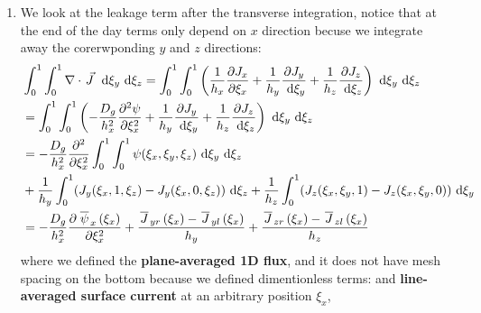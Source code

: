 \documentclass{school-22.211-notes}
\begin{document}
\begin{enumerate}
\item We look at the leakage term after the transverse integration, notice that at the end of the day terms only depend on $x$ direction becuse we integrate away the corerwponding $y$ and $z$ directions:
  \begin{align}
    &\int_0^1 \int_0^1 \nabla \cdot \left.\vec{J}\right. \mbox{ }\mathrm{d} \xi_y \mbox{ }\mathrm{d} \xi_z = \int_0^1 \int_0^1 \left( \frac{1}{h_x} \frac{\partial J_x}{\partial \xi_x} + \frac{1}{h_y} \frac{\partial J_y}{\mbox{ }\mathrm{d} \xi_y} + \frac{1}{h_z} \frac{\partial J_z}{\mbox{ }\mathrm{d} \xi_z} \right) \mbox{ }\mathrm{d} \xi_y \mbox{ }\mathrm{d} \xi_z \\
    &= \int_0^1 \int_0^1 \left( -\frac{D_g}{h_x^2} \frac{\partial^2 \psi}{\partial \xi_x^2} + \frac{1}{h_y} \frac{\partial J_y}{\mbox{ }\mathrm{d} \xi_y} + \frac{1}{h_z} \frac{\partial J_z}{\mbox{ }\mathrm{d} \xi_z} \right) \mbox{ }\mathrm{d} \xi_y \mbox{ }\mathrm{d} \xi_z \\
    &= - \frac{D_g}{h_x^2} \frac{\partial^2 }{\partial \xi_x^2} \int_0^1 \int_0^1 \psi(\xi_x, \xi_y, \xi_z) \mbox{ }\mathrm{d} \xi_y \mbox{ }\mathrm{d} \xi_z \\
    &+ \frac{1}{h_y} \int_0^1 (J_y(\xi_x, 1, \xi_z) - J_y(\xi_x, 0, \xi_z) )\mbox{ }\mathrm{d} \xi_z + \frac{1}{h_z} \int_0^1 (J_z(\xi_x, \xi_y, 1) - J_z(\xi_x, \xi_y, 0) ) \mbox{ }\mathrm{d} \xi_y \\
    &= - \frac{D_g}{h_x^2} \frac{\partial \left.\overline{\psi} \right._x (\xi_x)}{\partial \xi_x^2} + \frac{\left.\overline{J} \right._{yr}(\xi_x) - \left.\overline{J} \right._{yl} (\xi_x)}{h_y} + \frac{\left.\overline{J} \right._{zr} (\xi_x) - \left.\overline{J} \right._{zl} (\xi_x)}{h_z} 
  \end{align}
  where we defined the \textbf{plane-averaged 1D flux}, and it does not have mesh spacing on the bottom because we defined dimentionless terms:
  and \textbf{line-averaged surface current} at an arbitrary position $\xi_x$, 


\end{enumerate}
\end{document}
